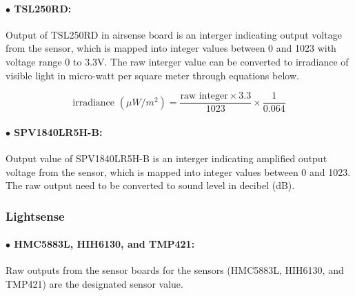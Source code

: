 \paragraph{$\bullet$ TSL250RD:}

Output of TSL250RD in airsense board is an interger indicating output voltage from the sensor, which is mapped into integer values between 0 and 1023 with voltage range 0 to 3.3V. The raw interger value can be converted to irradiance of visible light in micro-watt per square meter through equations below.


{\centering
\[ \text{irradiance } (\mu W/m^2) = \frac{\text{raw integer} \times 3.3}{1023} \times \frac{1}{0.064} \]
\par
}


\paragraph{$\bullet$ SPV1840LR5H-B:}

Output value of SPV1840LR5H-B is an interger indicating amplified output voltage from the sensor, which is mapped into integer values between 0 and 1023.
The raw output need to be converted to sound level in decibel (dB).




\bigbreak
\subsubsection{Lightsense}

\paragraph{$\bullet$ HMC5883L, HIH6130, and TMP421:}
Raw outputs from the sensor boards for the sensors (HMC5883L, HIH6130, and TMP421) are the designated sensor value.

